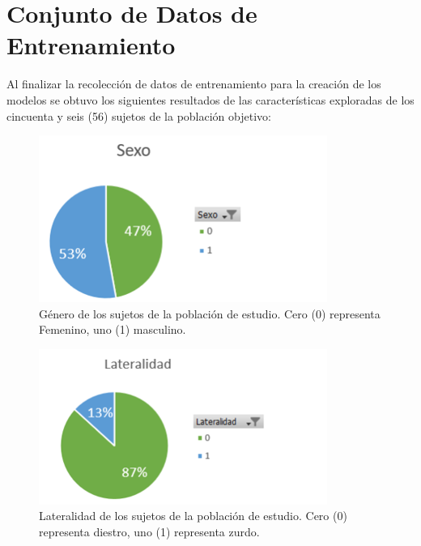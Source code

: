 \section{Conjunto de Datos de Entrenamiento}
Al finalizar la recolección de datos de entrenamiento para la creación de los modelos se obtuvo los siguientes resultados de las características exploradas de los cincuenta y seis (56) sujetos de la población objetivo:
\begin{figure}
    \centering
    \includegraphics[scale=1]{figuras/Imagen11.png}
    \caption{Género de los sujetos de la población de estudio. Cero (0) representa Femenino, uno (1) masculino.}
    \label{fig:my_label}
\end{figure}
\begin{figure}
    \centering
    \includegraphics[scale=1]{figuras/Imagen12.png}
    \caption{Lateralidad de los sujetos de la población de estudio. Cero (0) representa diestro, uno (1) representa zurdo.}
    \label{fig:my_label}
\end{figure}
